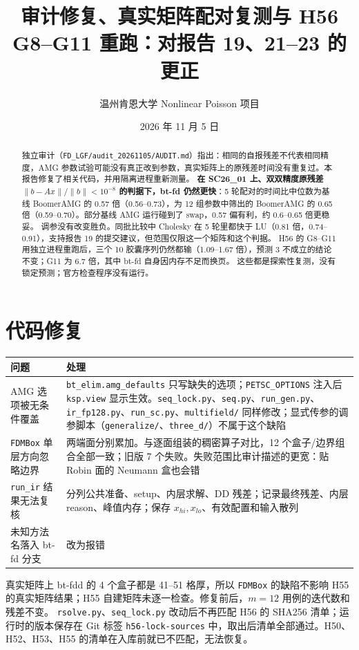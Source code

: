 \documentclass[11pt,a4paper]{ctexart}
\title{审计修复、真实矩阵配对复测与 H56 G8--G11 重跑：对报告 19、21--23 的更正}
\author{温州肯恩大学 \quad Nonlinear Poisson 项目}
\date{2026 年 11 月 5 日}
\begin{document}
\maketitle
\sloppy

\begin{abstract}
独立审计（\texttt{FD\_LGF/audit\_20261105/AUDIT.md}）指出：相同的自报残差不代表相同精度，AMG 参数试验可能没有真正改到参数，真实矩阵上的原残差时间没有重复过。本报告修复了相关代码，并用隔离进程重新测量。
\textbf{在 SC26\_01 上、双双精度原残差 $\|b-Ax\|/\|b\|<10^{-8}$ 的判据下，bt-fd 仍然更快}：5 轮配对的时间比中位数为基线 BoomerAMG 的 0.57 倍（0.56--0.73），为 12 组参数中筛出的 BoomerAMG 的 0.65 倍（0.59--0.70）。部分基线 AMG 运行碰到了 swap，0.57 偏有利，约 0.6--0.65 倍更稳妥。
调参没有改变胜负。同批比较中 Cholesky 在 5 轮里都快于 LU（0.81 倍，0.74--0.91），支持报告 19 的提交建议，但范围仅限这一个矩阵和这个判据。
H56 的 G8--G11 用独立进程重跑后，三个 10 胶囊序列仍然都输（1.09--1.67 倍），预测 3 不成立的结论不变；G11 为 6.7 倍，其中 bt-fd 自身因内存不足而换页。
这些都是探索性复测，没有锁定预测；官方检查程序没有运行。
\end{abstract}

\section{代码修复}
\begin{table}[H]
\centering\small
\begin{tabular}{p{4.1cm}p{11.8cm}}
\toprule
问题 & 处理 \\
\midrule
AMG 选项被无条件覆盖 & \texttt{bt\_elim.amg\_defaults} 只写缺失的选项；\texttt{PETSC\_OPTIONS} 注入后 \texttt{ksp.view} 显示生效。\texttt{seq\_lock.py}、\texttt{seq.py}、\texttt{run\_gen.py}、\texttt{ir\_fp128.py}、\texttt{run\_sc.py}、\texttt{multifield/} 同样修改；显式传参的调参脚本（\texttt{generalize/}、\texttt{three\_d/}）不属于这个缺陷 \\
\texttt{FDMBox} 单层方向忽略边界 & 两端面分别累加。与逐面组装的稠密算子对比，12 个盒子/边界组合全部一致；旧版 7 个失败。失败范围比审计描述的更宽：贴 Robin 面的 Neumann 盒也会错 \\
\texttt{run\_ir} 结果无法复核 & 分列公共准备、setup、内层求解、DD 残差；记录最终残差、内层 reason、峰值内存；保存 $x_{hi},x_{lo}$、有效配置和输入散列 \\
未知方法名落入 bt-fd 分支 & 改为报错 \\
\bottomrule
\end{tabular}
\end{table}
真实矩阵上 bt-fdd 的 4 个盒子都是 41--51 格厚，所以 \texttt{FDMBox} 的缺陷不影响 H55 的真实矩阵结果；H55 自建矩阵未逐一检查。修复前后，$m=12$ 用例的迭代数和残差不变。
\texttt{rsolve.py}、\texttt{seq\_lock.py} 改动后不再匹配 H56 的 SHA256 清单；运行时的版本保存在 Git 标签 \texttt{h56-lock-sources} 中，取出后清单全部通过。H50、H52、H53、H55 的清单在入库前就已不匹配，无法恢复。
\end{document}
